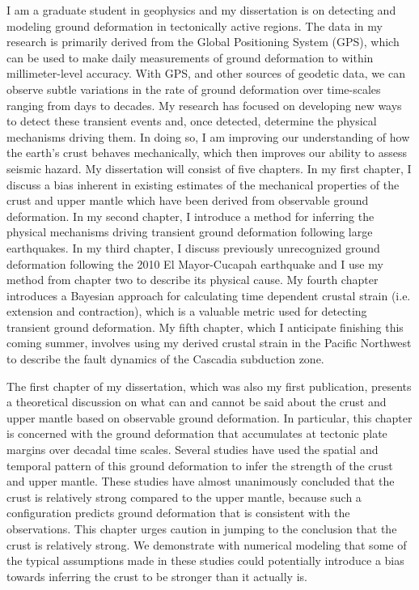 I am a graduate student in geophysics and my dissertation is on detecting and modeling ground deformation in tectonically active regions.  The data in my research is primarily derived from the Global Positioning System (GPS), which can be used to make daily measurements of ground deformation to within millimeter-level accuracy.  With GPS, and other sources of geodetic data, we can observe subtle variations in the rate of ground deformation over time-scales ranging from days to decades.  My research has focused on developing new ways to detect these transient events and, once detected, determine the physical mechanisms driving them.  In doing so, I am improving our understanding of how the earth’s crust behaves mechanically, which then improves our ability to assess seismic hazard.  My dissertation will consist of five chapters.  In my first chapter, I discuss a bias inherent in existing estimates of the mechanical properties of the crust and  upper mantle which have been derived from observable ground deformation.  In my second chapter, I introduce a method for inferring the physical mechanisms driving transient ground deformation following large earthquakes.  In my third chapter, I discuss previously unrecognized ground deformation following the 2010 El Mayor-Cucapah earthquake and I use my method from chapter two to describe its physical cause.  My fourth chapter introduces a Bayesian approach for calculating time dependent crustal strain (i.e. extension and contraction), which is a valuable metric used for detecting transient ground deformation.  My fifth chapter, which I anticipate finishing this coming summer, involves using my derived crustal strain in the Pacific Northwest to describe the fault dynamics of the Cascadia subduction zone.

The first chapter of my dissertation, which was also my first publication, presents a theoretical discussion on what can and cannot be said about the crust and upper mantle based on observable ground deformation.  In particular, this chapter is concerned with the ground deformation that accumulates at tectonic plate margins over decadal time scales.  Several studies have used the spatial and temporal pattern of this ground deformation to infer the strength of the crust and upper mantle. These studies have almost unanimously concluded that the crust is relatively strong compared to the upper mantle, because such a configuration predicts ground deformation that is consistent with the observations.  This chapter urges caution in jumping to the conclusion that the crust is relatively strong.  We demonstrate with numerical modeling that some of the typical assumptions made in these studies could potentially introduce a bias towards inferring the crust to be stronger than it actually is.     

